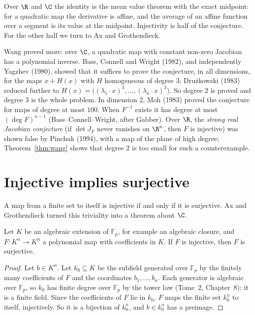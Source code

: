Over $\R$ and $\C$ the identity is the mean value theorem with the exact midpoint: for a quadratic map the derivative is affine, and the average of an affine
function over a segment is its value at the midpoint. Injectivity is half of the conjecture. For the other half we turn to Ax and Grothendieck.

\begin{remark}\label{rem:jacknown}
Wang proved more: over $\C$, a quadratic map with constant non-zero Jacobian has a polynomial inverse. Bass, Connell and Wright (1982), and independently Yagzhev (1980), showed
that it suffices to prove the conjecture, in all dimensions, for the maps $x+H(x)$ with $H$ homogeneous of degree $3$; Dru\.zkowski (1983) reduced further to
$H(x)=\bigl((\lambda_1\cdot x)^3,\dots,(\lambda_n\cdot x)^3\bigr)$. So degree $2$ is proved and degree $3$ is the whole problem. In dimension $2$, Moh (1983)
proved the conjecture for maps of degree at most $100$. When $F^{-1}$ exists it has degree at most $(\deg F)^{n-1}$ (Bass--Connell--Wright, after Gabber).
Over $\R$, the \emph{strong real Jacobian conjecture} (if $\det J_F$ never vanishes on $\R^n$, then $F$ is injective) was shown false by Pinchuk
(1994), with a map of the plane of high degree; Theorem~\ref{thm:wang} shows that degree $2$ is too small for such a counterexample.
\end{remark}

\section{Injective implies surjective}

A map from a finite set to itself is injective if and only if it is surjective. Ax and Grothendieck turned this triviality into a theorem about $\C$.

\begin{theorem}\label{thm:axgr}
Let $K$ be an algebraic extension of $\mathbb F_p$, for example an algebraic closure, and $F:K^n\to K^n$ a polynomial map with coefficients in $K$. If $F$ is
injective, then $F$ is surjective.
\end{theorem}
\begin{proof}
Let $b\in K^n$. Let $k_0\subseteq K$ be the subfield generated over $\mathbb F_p$ by the finitely many coefficients of $F$ and the coordinates $b_1,\dots,b_n$.
Each generator is algebraic over $\mathbb F_p$, so $k_0$ has finite degree over $\mathbb F_p$ by the tower law (Tome~2, Chapter~8): it is a finite field.
Since the coefficients of $F$ lie in $k_0$, $F$ maps the finite set $k_0^n$ to itself, injectively. So it is a bijection of $k_0^n$, and $b\in k_0^n$ has a
preimage.
\end{proof}

